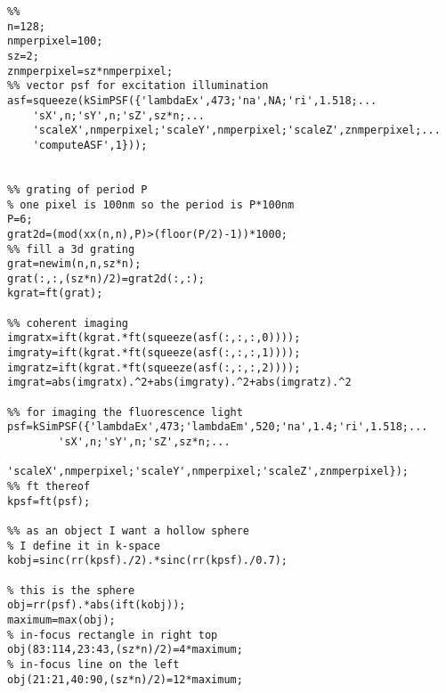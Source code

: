 \documentclass[11pt,abstracton,titlepage]{scrartcl}
\begin{document}
\begin{lstlisting}%%
n=128;
nmperpixel=100;
sz=2;
znmperpixel=sz*nmperpixel;
%% vector psf for excitation illumination
asf=squeeze(kSimPSF({'lambdaEx',473;'na',NA;'ri',1.518;...
    'sX',n;'sY',n;'sZ',sz*n;...
    'scaleX',nmperpixel;'scaleY',nmperpixel;'scaleZ',znmperpixel;...
    'computeASF',1}));


%% grating of period P
% one pixel is 100nm so the period is P*100nm
P=6;
grat2d=(mod(xx(n,n),P)>(floor(P/2)-1))*1000;
%% fill a 3d grating
grat=newim(n,n,sz*n);
grat(:,:,(sz*n)/2)=grat2d(:,:);
kgrat=ft(grat);

%% coherent imaging
imgratx=ift(kgrat.*ft(squeeze(asf(:,:,:,0))));
imgraty=ift(kgrat.*ft(squeeze(asf(:,:,:,1))));
imgratz=ift(kgrat.*ft(squeeze(asf(:,:,:,2))));
imgrat=abs(imgratx).^2+abs(imgraty).^2+abs(imgratz).^2

%% for imaging the fluorescence light
psf=kSimPSF({'lambdaEx',473;'lambdaEm',520;'na',1.4;'ri',1.518;...
        'sX',n;'sY',n;'sZ',sz*n;...
        'scaleX',nmperpixel;'scaleY',nmperpixel;'scaleZ',znmperpixel});
%% ft thereof
kpsf=ft(psf);

%% as an object I want a hollow sphere
% I define it in k-space
kobj=sinc(rr(kpsf)./2).*sinc(rr(kpsf)./0.7);

% this is the sphere
obj=rr(psf).*abs(ift(kobj));
maximum=max(obj);
% in-focus rectangle in right top
obj(83:114,23:43,(sz*n)/2)=4*maximum;
% in-focus line on the left
obj(21:21,40:90,(sz*n)/2)=12*maximum;
\end{lstlisting}


\end{document}
